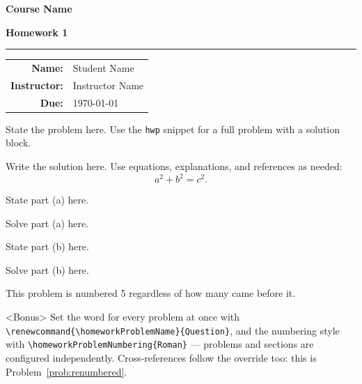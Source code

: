 \documentclass[oneside]{article}
\newcommand{\homeworkCourse}{Course Name}
\newcommand{\homeworkTitle}{Homework 1}
\newcommand{\homeworkAuthor}{Student Name}
\newcommand{\homeworkInstructor}{Instructor Name}
\newcommand{\homeworkDueDate}{\today}
\newcommand{\makehomeworktitle}{
    \begin{center}
        {\Large\bfseries\color{theme-subsection} \homeworkCourse\par}
        \vspace{0.35em}
        {\huge\bfseries\color{theme-chapter} \homeworkTitle\par}
        \vspace{0.7em}
        {\color{theme-header-rule}\rule{0.42\linewidth}{0.7pt}\par}
        \vspace{0.7em}
        \begin{tabular}{rl}
            {\bfseries\color{theme-section}Name:} & \homeworkAuthor \\
            {\bfseries\color{theme-section}Instructor:} & \homeworkInstructor \\
            {\bfseries\color{theme-section}Due:} & \homeworkDueDate
        \end{tabular}
    \end{center}
    \vspace{1.2em}
}
\begin{document}
\makehomeworktitle

\begin{homeworkProblem}
State the problem here. Use the \texttt{hwp} snippet for a full problem with a solution block.

\begin{solution}
Write the solution here. Use equations, explanations, and references as needed:
\[
    a^2 + b^2 = c^2.
\]
\end{solution}
\end{homeworkProblem}

\begin{homeworkProblem}
\begin{homeworkSection}
State part (a) here.
\begin{solution}
Solve part (a) here.
\end{solution}
\end{homeworkSection}

\begin{homeworkSection}
State part (b) here.
\begin{solution}
Solve part (b) here.
\end{solution}
\end{homeworkSection}
\end{homeworkProblem}

\begin{homeworkProblem}\label{prob:renumbered}
This problem is numbered 5 regardless of how many came before it.
\end{homeworkProblem}

\begin{homeworkProblem}<Bonus>
Set the word for every problem at once with
\texttt{\textbackslash renewcommand\{\textbackslash homeworkProblemName\}\{Question\}},
and the numbering style with
\texttt{\textbackslash homeworkProblemNumbering\{Roman\}} --- problems and
sections are configured independently. Cross-references follow the override too:
this is Problem~\ref{prob:renumbered}.
\end{homeworkProblem}
\end{document}

